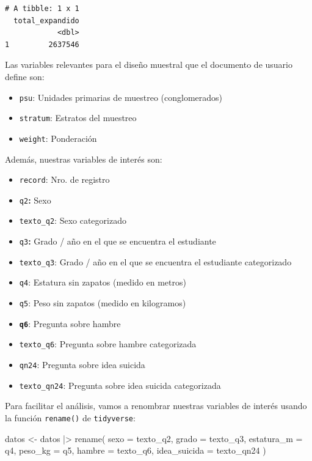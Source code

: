 \documentclass[
  spanish,
  a4paper,
]{scrbook}
\newenvironment{Shaded}{\begin{snugshade}}{\end{snugshade}}
\newcommand{\AttributeTok}[1]{\textcolor[rgb]{0.40,0.45,0.13}{#1}}
\newcommand{\FunctionTok}[1]{\textcolor[rgb]{0.28,0.35,0.67}{#1}}
\newcommand{\NormalTok}[1]{\textcolor[rgb]{0.00,0.23,0.31}{#1}}
\newcommand{\OtherTok}[1]{\textcolor[rgb]{0.00,0.23,0.31}{#1}}
\newcommand{\SpecialCharTok}[1]{\textcolor[rgb]{0.37,0.37,0.37}{#1}}
\begin{document}
\begin{verbatim}
# A tibble: 1 x 1
  total_expandido
            <dbl>
1         2637546
\end{verbatim}

Las variables relevantes para el diseño muestral que el documento de
usuario define son:

\begin{itemize}
\item
  \texttt{psu}: Unidades primarias de muestreo (conglomerados)
\item
  \texttt{stratum}: Estratos del muestreo
\item
  \texttt{weight}: Ponderación
\end{itemize}

Además, nuestras variables de interés son:

\begin{itemize}
\item
  \texttt{record}: Nro. de registro
\item
  \texttt{q2}\textbf{:} Sexo
\item
  \texttt{texto\_q2}: Sexo categorizado
\item
  \texttt{q3}\textbf{:} Grado / año en el que se encuentra el estudiante
\item
  \texttt{texto\_q3}: Grado / año en el que se encuentra el estudiante
  categorizado
\item
  \texttt{q4}: Estatura sin zapatos (medido en metros)
\item
  \texttt{q5}: Peso sin zapatos (medido en kilogramos)
\item
  \textbf{\texttt{q6}}: Pregunta sobre hambre
\item
  \texttt{texto\_q6}: Pregunta sobre hambre categorizada
\item
  \texttt{qn24}: Pregunta sobre idea suicida
\item
  \texttt{texto\_qn24}: Pregunta sobre idea suicida categorizada
\end{itemize}

Para facilitar el análisis, vamos a renombrar nuestras variables de
interés usando la función \texttt{rename()} de \texttt{tidyverse}:

\begin{Shaded}
\begin{Highlighting}[]
\NormalTok{datos }\OtherTok{\textless{}{-}}\NormalTok{ datos }\SpecialCharTok{|\textgreater{}}
  \FunctionTok{rename}\NormalTok{(}
    \AttributeTok{sexo =}\NormalTok{ texto\_q2,}
    \AttributeTok{grado =}\NormalTok{ texto\_q3,}
    \AttributeTok{estatura\_m =}\NormalTok{ q4,}
    \AttributeTok{peso\_kg =}\NormalTok{ q5,}
    \AttributeTok{hambre =}\NormalTok{ texto\_q6,}
    \AttributeTok{idea\_suicida =}\NormalTok{ texto\_qn24}
\NormalTok{  )}
\end{Highlighting}
\end{Shaded}
\end{document}
